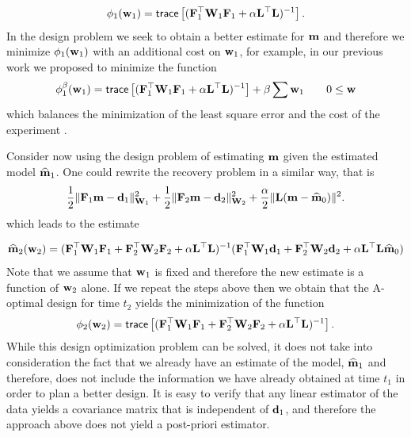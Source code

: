 \documentclass[11pt]{article}
\newcommand{\bfF}	{{\bf{F}}}
\newcommand{\bfL}	{{\bf{L}}}
\newcommand{\bfW}	{{\bf{W}}}
\newcommand{\bfd}	{{\bf{d}}}
\newcommand{\bfm}	{{\bf{m}}}
\newcommand{\bfw}	{{\bf{w}}}
\newcommand{\hf}        {{\frac 12}}
\newcommand{\bfmhat}    {{\widehat{\bfm}}}
\newcommand{\LtL}       { \bfL^{\top}\bfL}
\renewcommand{\hf}		 {\frac12}
\renewcommand{\bfmhat}	{\widehat{\bf m}}
\begin{document}
{\begin{eqnarray}
\label{design1}
\phi_{1}(\bfw_1 ) =  {\sf trace} \left[   (\bfF_{1}^{\top}\bfW_{1}\bfF_{1}   + 
 {\alpha} \LtL)^{-1} \right]. 
\end{eqnarray}
In the design problem we seek to obtain a better estimate for $\bfm$ and therefore
we minimize $\phi_{1}(\bfw_{1})$ with an additional cost on $\bfw_{1}$, for example, in our
previous work we proposed to minimize the function
\begin{eqnarray}
\label{designp1}
\phi_{1}^{\beta}(\bfw_1 ) =  {\sf trace} \left[   (\bfF_{1}^{\top}\bfW_{1}\bfF_{1}   + 
 {\alpha} \LtL)^{-1} \right]  + \beta \sum \bfw_{1} \quad \quad 0 \le \bfw 
\end{eqnarray}
which balances the minimization of the least square error and the cost of the experiment \cite{habera}.


\bigskip

Consider now using the design problem of estimating $\bfm$ given the estimated model $\widehat \bfm_{1}$.
One could rewrite the recovery problem in a similar way, that is
\begin{eqnarray}
\label{mest2}
\hf \| \bfF_{1} \bfm - \bfd_{1}\|^{2}_{\bfW_{1}} + \hf \| \bfF_{2} \bfm - \bfd_{2}\|^{2}_{\bfW_{2}}  + {\frac {\alpha} 2}
\|\bfL (\bfm -\bfmhat_{0}) \|^{2}. 
\end{eqnarray}
which leads to the estimate

\begin{eqnarray}
\label{mest2}
\bfmhat_{2}(\bfw_{2}) = (\bfF_{1}^{\top} \bfW_{1}\bfF_{1} +
\bfF_{2}^{\top} \bfW_{2}\bfF_{2} + \alpha \LtL)^{-1} (\bfF_{1}^{\top} \bfW_{1} \bfd_{1} +\bfF_{2}^{\top} \bfW_{2} \bfd_{2}
+ \alpha \LtL \bfmhat_{0})
\end{eqnarray}
Note that we assume that $\bfw_{1}$ is fixed and therefore the new estimate is a function of $\bfw_{2}$ alone.
If we repeat the steps above then we obtain that the A-optimal design for time $t_{2}$ yields the minimization of
the function
\begin{eqnarray}
\label{design2na}
\phi_{2}(\bfw_{2} ) =  {\sf trace} \left[   (\bfF_{1}^{\top}\bfW_{1}\bfF_{1}   + \bfF_{2}^{\top}\bfW_{2}\bfF_{2} +
\alpha \LtL)^{-1} \right]. 
\end{eqnarray}
While this design optimization problem can be solved, it does not take into consideration the fact that 
we already  have an estimate of the model, $\bfmhat_{1}$ and therefore, does not include the 
information we have already obtained at time $t_{1}$ in order to plan a better design.
It is easy to verify that any linear estimator of the data yields a covariance matrix that is independent of $\bfd_{1}$,
and therefore the approach above does not yield a post-priori estimator.


}
\end{document}
